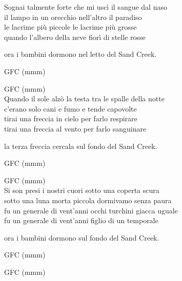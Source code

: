 \documentclass[10pt, twoside, a4paper]{article}
\begin{document}
Sognai talmente forte che mi usc\`i il sangue dal naso\\
il lampo in un orecchio nell'altro il paradiso\\
le lacrime pi\`u piccole le lacrime pi\`u grosse\\
quando l'albero della neve fior\`i di stelle rosse

\hspace{24pt} ora i bambini dormono nel letto del Sand Creek.

\hspace{48pt} G\hspace{36pt}F\hspace{18pt}C\hspace{24pt} (mmm)

\hspace{48pt} G\hspace{36pt}F\hspace{18pt}C\hspace{24pt} (mmm)\\

Quando il sole alz\`o la testa tra le spalle della notte\\
c'erano solo cani e fumo e tende capovolte\\
tirai una freccia in cielo per farlo respirare\\
tirai una freccia al vento per farlo sanguinare

\hspace{24pt} la terza freccia cercala sul fondo del Sand Creek.

\hspace{48pt} G\hspace{36pt}F\hspace{18pt}C\hspace{24pt} (mmm)

\hspace{48pt} G\hspace{36pt}F\hspace{18pt}C\hspace{24pt} (mmm)\\

Si son presi i nostri cuori sotto una coperta scura\\
sotto una luna morta piccola dormivamo senza paura\\
fu un generale di vent'anni occhi turchini giacca uguale\\
fu un generale di vent'anni figlio di un temporale

\hspace{24pt} ora i bambini dormono sul fondo del Sand Creek.

\hspace{48pt} G\hspace{36pt}F\hspace{18pt}C\hspace{24pt} (mmm)

\hspace{48pt} G\hspace{36pt}F\hspace{18pt}C\hspace{24pt} (mmm)
\end{document}

